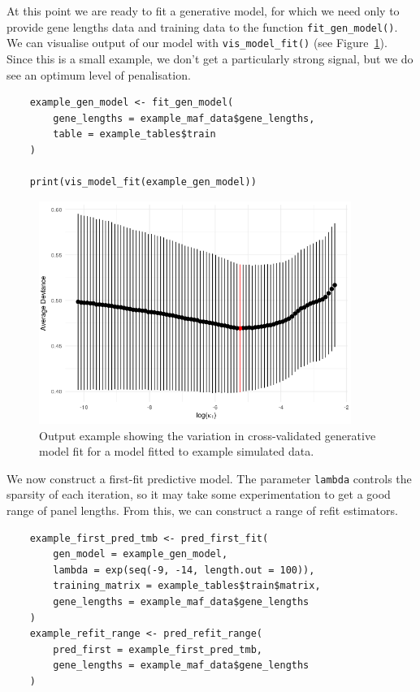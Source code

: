 \documentclass[../thesis.tex]{subfiles}
\begin{document}
At this point we are ready to fit a generative model, for which we need only to provide gene lengths data and training data to the function \lstinline{fit_gen_model()}. We can visualise output of our model with \lstinline{vis_model_fit()} (see Figure~\ref{fig:readme_example_gen_model}). Since this is a small example, we don’t get a particularly strong signal, but we do see an optimum level of penalisation.
\begin{lstlisting}
    example_gen_model <- fit_gen_model(
        gene_lengths = example_maf_data$gene_lengths, 
        table = example_tables$train
    )

    print(vis_model_fit(example_gen_model))
\end{lstlisting}
\begin{figure}[htbp]
    \centering
    \includegraphics[width=4in]{figures/chapter3/README-example_gen_model-1.png}
    \caption{Output example showing the variation in cross-validated generative model fit for a model fitted to example simulated data.}
    \label{fig:readme_example_gen_model}
\end{figure}
We now construct a first-fit predictive model. The parameter \lstinline{lambda} controls the sparsity of each iteration, so it may take some experimentation to get a good range of panel lengths. From this, we can construct a range of refit estimators.
\begin{lstlisting}
    example_first_pred_tmb <- pred_first_fit(
        gen_model = example_gen_model, 
        lambda = exp(seq(-9, -14, length.out = 100)),
        training_matrix = example_tables$train$matrix, 
        gene_lengths = example_maf_data$gene_lengths
    )
    example_refit_range <- pred_refit_range(
        pred_first = example_first_pred_tmb, 
        gene_lengths = example_maf_data$gene_lengths
    )
\end{lstlisting}
\end{document}
